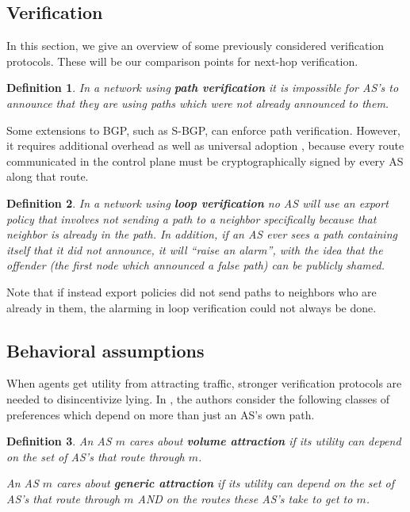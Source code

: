 \documentclass[10pt]{article}
\newtheorem{definition}{Definition}
\begin{document}
  \subsection{Verification}
    In this section, we give an overview of some previously considered 
    verification protocols. These will be our comparison points for next-hop
    verification.

    \begin{definition} 
      In a network using \textbf{path verification} it is
      impossible for AS's to announce that they are using paths which were not
      already announced to them.
    \end{definition}

    Some extensions to BGP, such as S-BGP, can enforce path verification.
    However, it requires additional overhead as well as universal adoption
    \cite{PartialDeploy}, because every route communicated in the control plane
    must be cryptographically signed by every AS along that route.

    \begin{definition}
      In a network using \textbf{loop verification} no AS will
      use an export policy that involves not sending a path to a neighbor
      specifically because that neighbor is already in the path.
      In addition, if
      an AS ever sees a path containing itself that it did not announce, it will
      ``raise an alarm'', with the idea that the offender (the first
      node which announced a false path) can be publicly shamed.
    \end{definition}

    Note that if instead export policies did not send paths to neighbors who are
    already in them, the alarming in loop verification could not always be done.

  \subsection{Behavioral assumptions}
    When agents get utility from attracting traffic, stronger verification
    protocols are needed to disincentivize lying.
    In \cite{Attraction}, the authors consider the following classes of
    preferences which depend on more than just an AS's own path.

    \begin{definition}
      An AS $m$ cares about \textbf{volume attraction} if its utility can depend on
      the set of AS's that route through $m$.

      An AS $m$ cares about \textbf{generic attraction} if its utility can depend on
      the set of AS's that route through $m$ AND on the routes these AS's take to get to $m$.
    \end{definition}
\end{document}
